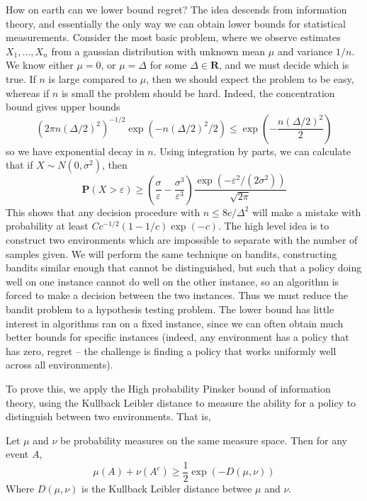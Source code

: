 How on earth can we lower bound regret? The idea descends from information theory, and essentially the only way we can obtain lower bounds for statistical measurements. Consider the most basic problem, where we observe estimates $X_1, \dots, X_n$ from a gaussian distribution with unknown mean $\mu$ and variance $1/n$. We know either $\mu = 0$, or $\mu = \Delta$ for some $\Delta \in \mathbf{R}$, and we must decide which is true. If $n$ is large compared to $\mu$, then we should expect the problem to be easy, whereas if $n$ is small the problem should be hard. Indeed, the concentration bound gives upper bounds
%
\[ (2 \pi n (\Delta/2)^2)^{-1/2} \exp(-n (\Delta/2)^2/2) \leq \exp(- \frac{n(\Delta/2)^2}{2}) \]
%
so we have exponential decay in $n$. Using integration by parts, we can calculate that if $X \sim N(0,\sigma^2)$, then
%
\[ \mathbf{P}(X > \varepsilon) \geq \left( \frac{\sigma}{\varepsilon} - \frac{\sigma^3}{\varepsilon^3} \right) \frac{\exp(-\varepsilon^2/(2\sigma^2))}{\sqrt{2\pi}} \]
%
This shows that any decision procedure with $n \leq 8c/\Delta^2$ will make a mistake with probability at least $Cc^{-1/2}(1 - 1/c) \exp(-c)$. The high level idea is to construct two environments which are impossible to separate with the number of samples given. We will perform the same technique on bandits, constructing bandits similar enough that cannot be distinguished, but such that a policy doing well on one instance cannot do well on the other instance, so an algorithm is forced to make a decision between the two instances. Thus we must reduce the bandit problem to a hypothesis testing problem. The lower bound has little interest in algorithms ran on a fixed instance, since we can often obtain much better bounds for specific instances (indeed, any environment has a policy that has zero, regret -- the challenge is finding a policy that works uniformly well across all environments).

To prove this, we apply the High probability Pinsker bound of information theory, using the Kullback Leibler distance to measure the ability for a policy to distinguish between two environments. That is,

\begin{theorem}
    Let $\mu$ and $\nu$ be probability measures on the same measure space. Then for any event $A$,
    \[ \mu(A) + \nu(A^c) \geq \frac{1}{2} \exp(-D(\mu,\nu)) \]
    Where $D(\mu, \nu)$ is the Kullback Leibler distance betwee $\mu$ and $\nu$.
\end{theorem}

